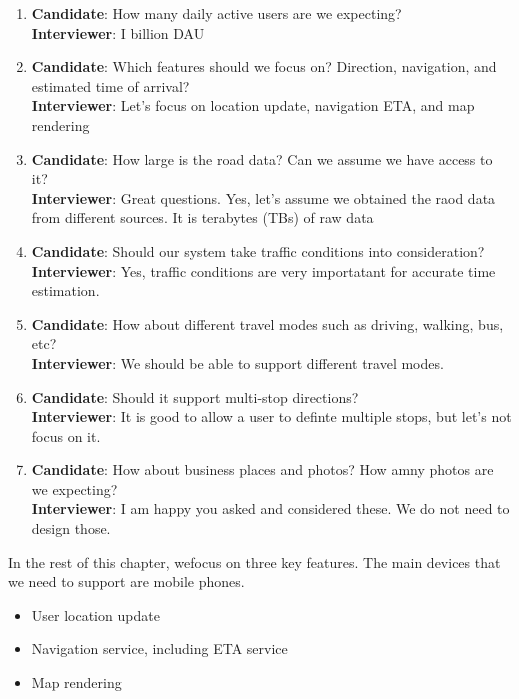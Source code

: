 \documentclass{report}
\theoremstyle{definition}
\begin{document}
\begin{enumerate}
\item
\textbf{Candidate}: How many daily active users are we expecting?\\
\textbf{Interviewer}: I billion DAU

\item
\textbf{Candidate}: Which features should we focus on? Direction, navigation, and estimated time of arrival?\\
\textbf{Interviewer}: Let's focus on location update, navigation ETA, and map rendering

\item
\textbf{Candidate}: How large is the road data? Can we assume we have access to it?\\
\textbf{Interviewer}: Great questions. Yes, let's assume we obtained the raod data from different sources. It is terabytes (TBs) of raw data

\item
\textbf{Candidate}: Should our system take traffic conditions into consideration?\\
\textbf{Interviewer}: Yes, traffic conditions are very importatant for accurate time estimation.

\item
\textbf{Candidate}: How about different travel modes such as driving, walking, bus, etc?\\
\textbf{Interviewer}: We should be able to support different travel modes.

\item
\textbf{Candidate}: Should it support multi-stop directions?\\
\textbf{Interviewer}: It is good to allow a user to definte multiple stops, but let's not focus on it.

\item
\textbf{Candidate}: How about business places and photos? How amny photos are we expecting? \\
\textbf{Interviewer}: I am happy you asked and considered these. We do not need to design those.
\end{enumerate}

In the rest of this chapter, wefocus on three key features. The main devices that we need to support are mobile phones.

\begin{itemize}
\item
User location update
\item
Navigation service, including ETA service
\item
Map rendering
\end{itemize}
\end{document}
